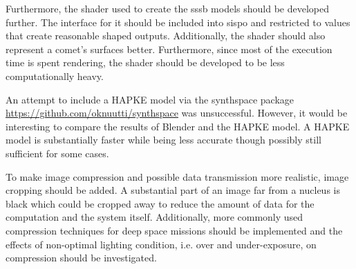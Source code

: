 Furthermore, the shader used to create the \gls{sssb} models should be developed further. The interface for it should be included into \gls{sispo} and restricted to values that create reasonable shaped outputs. Additionally, the shader should also represent a comet's surfaces better. Furthermore, since most of the execution time is spent rendering, the shader should be developed to be less computationally heavy.

An attempt to include a HAPKE model via the synthspace package \url{https://github.com/oknuutti/synthspace} was unsuccessful. However, it would be interesting to compare the results of Blender and the HAPKE model. A HAPKE model is substantially faster while being less accurate though possibly still sufficient for some cases.

To make image compression and possible data transmission more realistic, image cropping should be added. A substantial part of an image far from a nucleus is black which could be cropped away to reduce the amount of data for the computation and the system itself. Additionally, more commonly used compression techniques for deep space missions should be implemented and the effects of non-optimal lighting condition, i.e. over and under-exposure, on compression should be investigated.